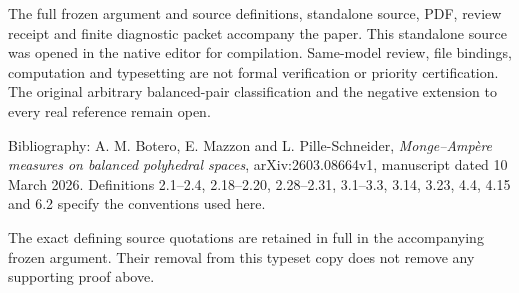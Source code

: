 \documentclass[
  11pt,
]{article}
\begin{document}
The full frozen argument and source definitions, standalone source,
PDF, review receipt and finite diagnostic packet accompany the paper.
This standalone source was opened in the native editor for compilation.
Same-model review, file bindings, computation and typesetting are not
formal verification or priority certification. The original arbitrary
balanced-pair classification and the negative extension to every real
reference remain open.

Bibliography: A. M. Botero, E. Mazzon and L. Pille-Schneider,
\emph{Monge--Ampère measures on balanced polyhedral spaces},
arXiv:2603.08664v1, manuscript dated 10 March 2026. Definitions
2.1--2.4, 2.18--2.20, 2.28--2.31, 3.1--3.3, 3.14, 3.23, 4.4, 4.15 and
6.2 specify the conventions used here.

The exact defining source quotations are retained in full in the
accompanying frozen argument. Their removal from this typeset copy
does not remove any supporting proof above.
\end{document}
